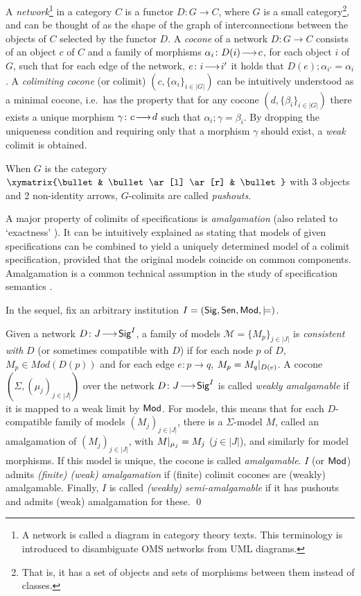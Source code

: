 \documentclass[10pt,fleqn,final]{scrreprt}
\newcommand{\Sig}{\mathsf{Sig}}
\newenvironment{definitions}[0]{\medskip }{}
\begin{document}
\begin{definitions}
A \emph{network}\footnote{A network is called a diagram in category theory texts. This terminology is introduced to disambiguate OMS networks
from UML diagrams.} in a category $C$ is 
a functor $D:G\to C$, where $G$ is a small category\footnote{That is, it has a set of objects and sets of morphisms between them
instead of classes.}, and can be thought of as the shape of the graph of
interconnections between the objects of $C$ selected by the functor $D$. A \emph{cocone} of
a network $D:G\to C$ consists of an object $c$ of $C$ and a family of
morphisms $\alpha_i\colon D(i)\!\longrightarrow\!c$, for each object $i$ of $G$, such that for
each edge of the network, $e\colon i\!\longrightarrow\!i'$  it holds that 
$D(e);\alpha_{i'} = \alpha_{i}$. 
A \emph{colimiting cocone} (or colimit) $(c, \{\alpha_i\}_{i\in|G|})$ can be
intuitively understood as a minimal cocone, i.e.\ has the property that for any 
cocone $(d, \{\beta_i\}_{i\in |G|})$ there exists a unique morphism 
$\gamma\colon c\!\longrightarrow\!d$ such that $\alpha_i;\gamma = \beta_i$. By dropping the 
uniqueness condition and requiring only that a morphism $\gamma$ should exist,
 a \emph{weak} colimit is obtained. 

When $G$ is the category $\xymatrix{\bullet & \bullet \ar[l] \ar[r]
& \bullet }$ with 3 objects and 2 non-identity arrows, $G$-colimits are
called  \emph{pushouts}.  

A major property of colimits of specifications is \emph{amalgamation} (also related to `exactness' \cite{DGS91}). It can be intuitively explained as 
stating that models of given
specifications can be combined to yield a uniquely determined model of
a colimit specification, provided that the original models coincide on
common components. Amalgamation is a common technical assumption in the 
study of specification semantics
\cite{STbook}.

In the sequel, fix an arbitrary institution
$I=(\Sig,\Sen,\Mod,\models)$.  

\begin{definition}
Given a network $D\map{J}{\Sig^I}$, 
a family of models $\mathcal{M} = \{M_p\}_{j\in |J|}$ is
\emph{consistent with} $D$ (or sometimes compatible with $D$) 
if for each node $p$ of $D$, $M_p \in Mod(D(p))$ and
for each edge $e:p\rightarrow q$, $M_p = M_q|_{D(e)}$.
  A cocone
$(\Sigma,(\mu_j)_{j\in|J|})$ over the network $D\map{J}{\Sig^I}$ is
called \emph{weakly amalgamable} if it is mapped to a weak limit by $\mathsf{Mod}$.
For models, this means that for each $D$-compatible family of
models $(M_j)_{j\in|J|}$, there is a $\Sigma$-model $M$, called an amalgamation of 
 $(M_j)_{j\in|J|}$,
with
$M|_{\mu_j}=M_j$ ($j\in|J|$), and similarly for model morphisms.
 If this model is unique, the cocone
is called \emph{amalgamable}. 
$I$ (or $\mathsf{Mod}$) admits \emph{(finite) (weak)
amalgamation} if (finite) colimit cocones are (weakly) amalgamable.
Finally, $I$ is called \emph{(weakly) semi-amalgamable} if 
it has pushouts and admits (weak) amalgamation for these.
\qed\end{definition}


\end{definitions}
\end{document}
